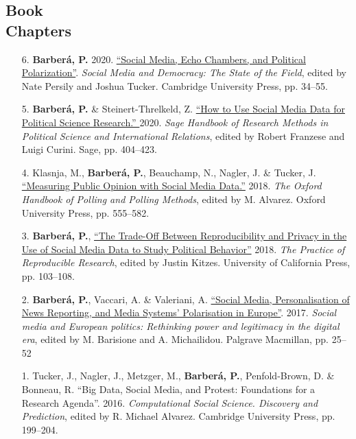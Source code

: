 \documentclass[margin,line,11pt]{resume}
\begin{document}
\begin{resume}
\section{\mysidestyle Book\\Chapters} 
\vspace{.15cm}    
\begin{itemize}[leftmargin=5.5mm]
\item[6.] \textbf{Barber\'{a}, P.} 2020. \href{http://www.pablobarbera.com/static/echo-chambers.pdf}{``Social Media, Echo Chambers, and Political Polarization''}. \textit{Social Media and Democracy: The State of the Field}, edited by Nate Persily and Joshua Tucker. Cambridge University Press, pp. 34--55.

\item[5.] \textbf{Barber\'{a}, P.} \& Steinert-Threlkeld, Z. \href{http://www.pablobarbera.com/static/social-media-data-generators.pdf}{``How to Use Social Media Data for Political Science Research.'' } 2020. \textit{Sage Handbook of Research Methods in Political Science and International Relations}, edited by Robert Franzese and Luigi Curini. Sage, pp. 404--423.

\item[4.] Klasnja, M., \textbf{Barber\'{a}, P.}, Beauchamp, N., Nagler, J. \& Tucker, J. \href{http://www.oxfordhandbooks.com/view/10.1093/oxfordhb/9780190213299.001.0001/oxfordhb-9780190213299-e-3}{``Measuring Public Opinion with Social Media Data.''} 2018. \textit{The Oxford Handbook of Polling and Polling Methods}, edited by M. Alvarez. Oxford University Press, pp. 555--582.

\item[3.] \textbf{Barber\'{a}, P.}, \href{https://www.practicereproducibleresearch.org/case-studies/barbera.html}{``The Trade-Off Between Reproducibility and Privacy in the Use of Social Media Data to Study Political Behavior''} 2018. \textit{The Practice of Reproducible Research}, edited by Justin Kitzes. University of California Press, pp. 103--108. 

\item[2.] \textbf{Barber\'{a}, P.}, Vaccari, A. \& Valeriani, A. \href{https://link.springer.com/chapter/10.1057/978-1-137-59890-5_2}{``Social Media, Personalisation of News Reporting, and Media Systems' Polarisation in Europe''}. 2017. \textit{Social media and European politics: Rethinking power and legitimacy in the digital era}, edited by M. Barisione and A. Michailidou. Palgrave Macmillan, pp. 25--52

\item[1.] Tucker, J., Nagler, J., Metzger, M., \textbf{Barber\'{a}, P.}, Penfold-Brown, D. \& Bonneau, R. ``Big Data, Social Media, and Protest: Foundations for a Research Agenda''. 2016. \textit{Computational Social Science. Discovery and Prediction}, edited by R. Michael Alvarez. Cambridge University Press, pp. 199--204.
\end{itemize}



\end{resume}
\end{document}
